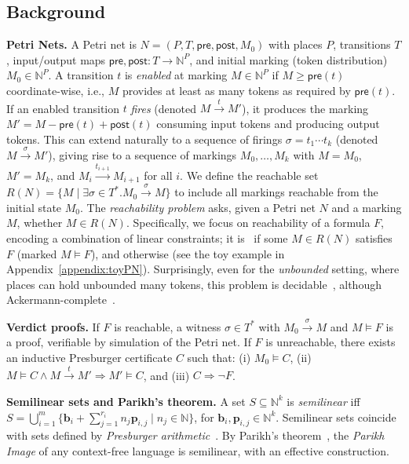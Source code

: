 \subsection{Background}
\label{subsec:background}

\textbf{Petri Nets.} 
A Petri net is $N=(P,T,\mathsf{pre},\mathsf{post},M_0)$ with places $P$, transitions $T$, input/output maps $\mathsf{pre},\mathsf{post}:T\to\mathbb N^P$, and initial marking (token distribution) $M_0\in\mathbb N^P$.  
	A transition $t$ is \textit{enabled} at marking $M \in \mathbb N^P$ if $M\ge \mathsf{pre}(t)$ coordinate-wise, i.e., $M$ provides at least as many tokens as required by $\mathsf{pre}(t)$.
	If an enabled transition \(t\) \textit{fires} (denoted $M\xrightarrow{t}M'$), it produces the marking $M' = M - \mathsf{pre}(t) + \mathsf{post}(t)$ consuming input tokens and producing output tokens.
	This can extend naturally to a sequence of firings $\sigma = t_1\cdots t_k$ (denoted $M \xrightarrow{\sigma} M'$), giving rise to a sequence of markings $M_0,\ldots,M_k$ with $M=M_0$, $M'=M_k$, and $M_i \xrightarrow{t_{i+1}} M_{i+1}$ for all $i$. 
	We define the reachable set $R(N)=\{M \mid \exists \sigma\in T^*. M_0 \xrightarrow{\sigma} M\}$ to include all markings reachable from the initial state $M_0$.
	The \textit{reachability problem} asks, given a Petri net $N$ and a marking $M$, whether $M\in R(N)$. 
	Specifically, we focus on reachability of a formula $F$, encoding a combination of linear constraints; it is \sat\ if some $M\in R(N)$ satisfies $F$ (marked $M \models F$), and otherwise \unsat{} (see the toy example in 	Appendix~\ref{appendix:toyPN}).
	Surprisingly, even for the \textit{unbounded} setting, where places can hold unbounded many tokens, this problem is decidable~\cite{Ma81,Ko82,La92}, although Ackermann-complete~\cite{CzWo22,Le22}.   

	
	
\medskip
\noindent
\textbf{Verdict proofs.} 
If $F$ is reachable, a witness $\sigma\in T^*$ with $M_0\xrightarrow{\sigma}M$ and $M\models F$ is a proof, verifiable by simulation of the Petri net.  
	If $F$ is unreachable, there exists~\cite{Le09} an inductive Presburger certificate $C$ such that:  
	(i) $M_0\models C$, (ii) $M\models C \wedge M\xrightarrow{t}M'\Rightarrow M'\models C$, and (iii) $C\Rightarrow \neg F$.

\medskip
\noindent
\textbf{Semilinear sets and Parikh’s theorem.} 
A set $S\subseteq\mathbb N^k$ is \textit{semilinear} iff  
	$S=\bigcup_{i=1}^m \{\mathbf b_i+\sum_{j=1}^{r_i} n_j\mathbf p_{i,j}\mid n_j\in\mathbb N\}$,  
	for $\mathbf b_i,\mathbf p_{i,j}\in\mathbb N^k$.  
	Semilinear sets coincide with sets defined by \textit{Presburger arithmetic}~\cite{Pr29}.  
	By Parikh’s theorem~\cite{Parikh66}, the \textit{Parikh Image} of any context-free language is semilinear, with an effective construction.

